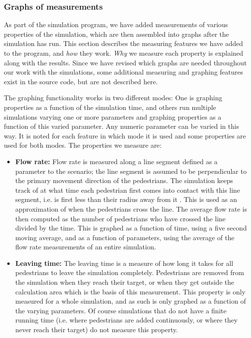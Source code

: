 \subsubsection{Graphs of measurements}
As part of the simulation program, we have added measurements of various 
properties of the simulation, which are then assembled into graphs after the 
simulation has run. This section describes the measuring features we have 
added to the program, and \emph{how} they work. \emph{Why} we measure each 
property is explained along with the results. Since we have revised which 
graphs are needed throughout our work with the simulations, some additional 
measuring and graphing features exist in the source code, but are not 
described here.

The graphing functionality works in two different modes: One is graphing 
properties as a function of the simulation time, and others run multiple 
simulations varying one or more parameters and graphing properties as a 
function of this varied parameter. Any numeric parameter can be varied in this 
way. It is noted for each feature in which mode it is used and some properties 
are used for both modes. The properties we measure are:


\begin{itemize}

    \item \textbf{Flow rate:} Flow rate is measured along a line segment 
        defined as a parameter to the scenario; the line segment is assumed to 
        be perpendicular to the primary movement direction of the pedestrians.  
        The simulation keeps track of at what time each pedestrian first comes 
        into contact with this line segment, i.e. is first less than their 
        radius away from it . This is used as an approximation of when the 
        pedestrians cross the line. The average flow rate is then computed as 
        the number of pedestrians who have crossed the line divided by the 
        time.  This is graphed as a function of time, using a five second 
        moving average, and as a function of parameters, using the average of 
        the flow rate measurements of an entire simulation.

    \item \textbf{Leaving time:} The leaving time is a measure of how long it 
        takes for all pedestrians to leave the simulation completely. Pedestrians are 
        removed from the simulation when they reach their target, or when they 
        get outside the calculation area which is the basis of this 
        measurement. This property is only measured for a whole simulation, 
        and as such is only graphed as a function of the varying parameters. 
        Of course simulations that do not have a finite running time (i.e. 
        where pedestrians are added continuously, or where they never reach their 
        target) do not measure this property.
\end{itemize}

